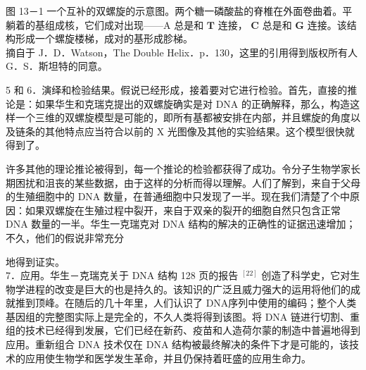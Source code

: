 图 13－1 一个互补的双螺旋的示意图。两个糖一磷酸盐的脊椎在外面卷曲着。平躺着的基组成核，它们成对出现——A 总是和 $\mathbf{T}$ 连接， $\mathbf{C}$ 总是和 $\mathbf{G}$ 连接。该结构形成一个螺旋楼梯，成对的基形成胗梯。\\
摘自于 J．D．Watson，The Double Helix．p．130，这里的引用得到版权所有人 G．S．斯坦特的同意。

5 和 6．演绎和检验结果。假说已经形成，接着要对它进行检验。首先，直接的推论是：如果华生和克瑞克提出的双螺旋确实是对 DNA 的正确解释，那么，构造这样一个三维的双螺旋模型是可能的，即所有基都被安排在内部，并且螺旋的角度以及链条的其他特点应当符合以前的 X 光图像及其他的实验结果。这个模型很快就得到了。

许多其他的理论推论被得到，每一个推论的检验都获得了成功。令分子生物学家长期困扰和沮丧的某些数据，由于这样的分析而得以理解。人们了解到，来自于父母的生殖细胞中的 DNA 数量，在普通细胞中只发现了一半。现在我们清楚了个中原因：如果双螺旋在生殖过程中裂开，来自于双亲的裂开的细胞自然只包含正常 DNA 数量的一半。华生一克瑞克对 DNA 结构的解决的正确性的证据迅速增加；不久，他们的假说非常充分

地得到证实。\\
7．应用。华生－克瑞克关于 DNA 结构 128 页的报告 ${ }^{[22]}$ 创造了科学史，它对生物学进程的改变是巨大的也是持久的。该知识的广泛且威力强大的运用将他们的成就推到顶峰。在随后的几十年里，人们认识了 DNA序列中使用的编码；整个人类基因组的完整图实际上是完全的，不久人类将得到该图。将 DNA 链进行切割、重组的技术已经得到发展，它们已经在新药、疫苗和人造荷尔蒙的制造中普遍地得到应用。重新组合 DNA 技术仅在 DNA 结构被最终解决的条件下才是可能的，该技术的应用使生物学和医学发生革命，并且仍保持着旺盛的应用生命力。 

